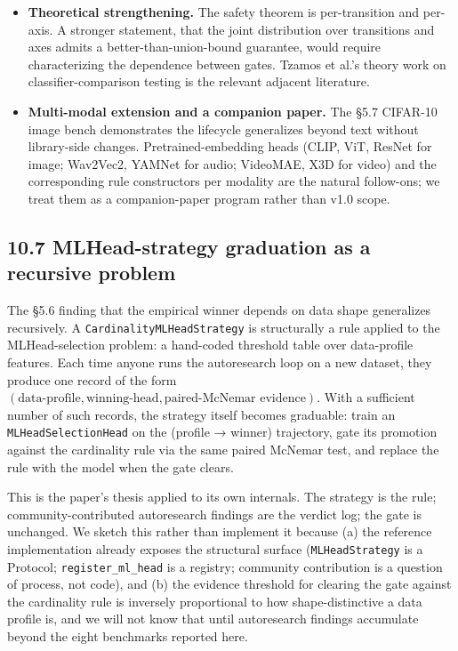 \begin{itemize}
  selection is in preparation; characterizing the verdict-quality /
  verdict-rate frontier across model classes is a paper in itself.
\item
  \textbf{Theoretical strengthening.} The safety theorem is
  per-transition and per-axis. A stronger statement, that the joint
  distribution over transitions and axes admits a
  better-than-union-bound guarantee, would require characterizing the
  dependence between gates. Tzamos et al.'s theory work on
  classifier-comparison testing is the relevant adjacent literature.
\item
  \textbf{Multi-modal extension and a companion paper.} The §5.7
  CIFAR-10 image bench demonstrates the lifecycle generalizes beyond
  text without library-side changes. Pretrained-embedding heads (CLIP,
  ViT, ResNet for image; Wav2Vec2, YAMNet for audio; VideoMAE, X3D for
  video) and the corresponding rule constructors per modality are the
  natural follow-ons; we treat them as a companion-paper program rather
  than v1.0 scope.
\end{itemize}

\subsection{10.7 MLHead-strategy graduation as a recursive \sysname{}
problem}\label{mlhead-strategy-graduation-as-a-recursive-\pkgname{}-problem}

The §5.6 finding that the empirical winner depends on data shape
generalizes recursively. A \texttt{CardinalityMLHeadStrategy} is
structurally a \sysname{} rule applied to the MLHead-selection problem: a
hand-coded threshold table over data-profile features. Each time anyone
runs the autoresearch loop on a new dataset, they produce one record of
the form
\((\text{data-profile}, \text{winning-head}, \text{paired-McNemar evidence})\).
With a sufficient number of such records, the strategy itself becomes
graduable: train an \texttt{MLHeadSelectionHead} on the (profile →
winner) trajectory, gate its promotion against the cardinality rule via
the same paired McNemar test, and replace the rule with the model when
the gate clears.

This is the paper's thesis applied to its own internals. The strategy is
the rule; community-contributed autoresearch findings are the verdict
log; the gate is unchanged. We sketch this rather than implement it
because (a) the reference implementation already exposes the structural
surface (\texttt{MLHeadStrategy} is a Protocol;
\texttt{register\_ml\_head} is a registry; community contribution is a
question of process, not code), and (b) the evidence threshold for
clearing the gate against the cardinality rule is inversely proportional
to how shape-distinctive a data profile is, and we will not know that
until autoresearch findings accumulate beyond the eight benchmarks
reported here.

